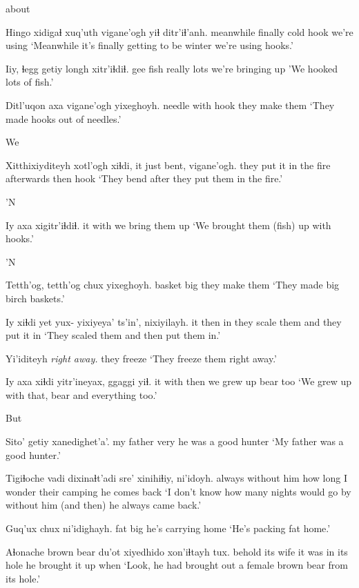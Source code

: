 \documentclass[12pt]{article}
\begin{document}
about

\gll Hingo     xidigaɬ xuq'uth           vigane'ogh {yiɬ ditr'iɬ'anh.}
meanwhile finally cold hook       {we're using}
\glt `Meanwhile it's finally getting to be winter we're using hooks.'
\glend

\gll Iiy, ɬegg getiy  longh xitr'iɬdiɬ.
gee    fish really lots  {we're bringing up}
\glt     'We hooked lots of fish.'
\glend

\gll Ditl'uqon axa  vigane'ogh yixeghoyh.
needle    with hook       {they make them}
\glt `They made hooks out of needles.'
\glend

We

\gll Xitthixiyditeyh         xotl'ogh xiɬdi, {it just bent,} vigane'ogh.
{they put it in the fire} afterwards then {} hook
\glt `They bend after they put them in the fire.'
\glend

'N

\gll   Iy axa  xigitr'iɬdiɬ.
 it with {we bring them up  }
\glt `We brought them (fish) up with hooks.'
\glend

'N

\gll Tetth'og, tetth'og chux yixeghoyh.     
basket    {}         big  {they make them }
\glt `They made big birch baskets.' 
\glend

\gll Iy xiɬdi yet yux- yixiyeya'       ts'in', nixiyilayh.
it then  in  {}  {they scale them} and   {they put it in}
\glt `They scaled them and then put them in.'
\glend

\gll Yi'iditeyh    {\em right away.}
{{they freeze}}
\glt `They freeze them right away.'
\glend

\gll Iy axa  xiɬdi yitr'ineyax, ggaggi  yiɬ.
it with then  {we grew up} bear   too
\glt `We grew up with that, bear and everything too.'
\glend

But

\gll Sito'     getiy xanedighet'a'.
{my father} very  {he was a good hunter}
\glt `My father was a good hunter.'
\glend

\gll Tigiɬoche vadi        dixinaɬt'adi sre'     xinihiɬiy,     ni'idoyh.
always    {without him} {how long} {I wonder} {their camping} {he comes back}
\glt `I don't know how many nights would go by without him (and then) he always came back.'
\glend

\gll Guq'ux chux ni'idighayh.
fat    big  {he's carrying home}
\glt `He's packing fat home.'
\glend

\gll Aɬonache {brown bear } du'ot    {xiyedhido}           xon'iɬtayh        tux.
behold {} {its wife} {it was in its hole}  {he brought it up} when
\glt `Look, he had brought out a female brown bear from its hole.'
\glend
\end{document}

